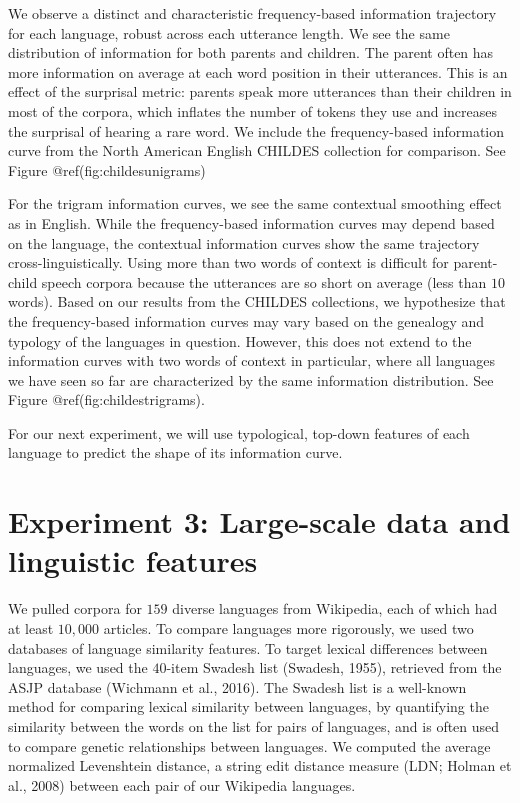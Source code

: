 \documentclass[10pt, letterpaper]{article}
\begin{document}
We observe a distinct and characteristic frequency-based information
trajectory for each language, robust across each utterance length. We
see the same distribution of information for both parents and children.
The parent often has more information on average at each word position
in their utterances. This is an effect of the surprisal metric: parents
speak more utterances than their children in most of the corpora, which
inflates the number of tokens they use and increases the surprisal of
hearing a rare word. We include the frequency-based information curve
from the North American English CHILDES collection for comparison. See
Figure @ref(fig:childesunigrams)

For the trigram information curves, we see the same contextual smoothing
effect as in English. While the frequency-based information curves may
depend based on the language, the contextual information curves show the
same trajectory cross-linguistically. Using more than two words of
context is difficult for parent-child speech corpora because the
utterances are so short on average (less than \(10\) words). Based on
our results from the CHILDES collections, we hypothesize that the
frequency-based information curves may vary based on the genealogy and
typology of the languages in question. However, this does not extend to
the information curves with two words of context in particular, where
all languages we have seen so far are characterized by the same
information distribution. See Figure @ref(fig:childestrigrams).

For our next experiment, we will use typological, top-down features of
each language to predict the shape of its information curve.

\hypertarget{experiment-3-large-scale-data-and-linguistic-features}{%
\section{Experiment 3: Large-scale data and linguistic
features}\label{experiment-3-large-scale-data-and-linguistic-features}}

We pulled corpora for \(159\) diverse languages from Wikipedia, each of
which had at least \(10,000\) articles. To compare languages more
rigorously, we used two databases of language similarity features. To
target lexical differences between languages, we used the \(40\)-item
Swadesh list (Swadesh, 1955), retrieved from the ASJP database (Wichmann
et al., 2016). The Swadesh list is a well-known method for comparing
lexical similarity between languages, by quantifying the similarity
between the words on the list for pairs of languages, and is often used
to compare genetic relationships between languages. We computed the
average normalized Levenshtein distance, a string edit distance measure
(LDN; Holman et al., 2008) between each pair of our Wikipedia languages.
\end{document}
